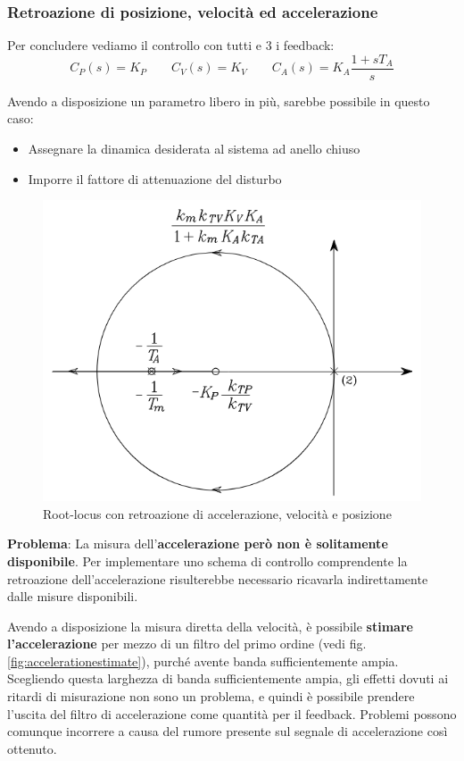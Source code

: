 \vspace{35pt}
\subsubsection{Retroazione di posizione, velocità ed accelerazione}

Per concludere vediamo il controllo con tutti e 3 i feedback:
$$
C_P(s) = K_P \qquad C_V(s)=K_V \qquad C_A(s)=K_A\frac{1+sT_A}{s}
$$

Avendo a disposizione un parametro libero in più, sarebbe
possibile in questo caso:
\begin{itemize}
	\item Assegnare la dinamica desiderata al sistema ad anello chiuso
	\item Imporre il fattore di attenuazione del disturbo
\end{itemize}


\begin{figure}[ht!]
	\centering
	\includegraphics[width=0.5\linewidth]{images/root_locus_3}
	\caption{Root-locus con retroazione di accelerazione, velocità e posizione}
	\label{fig:rootlocus3}
\end{figure}

\textbf{Problema}:
La misura dell’\textbf{accelerazione però non è solitamente disponibile}. Per implementare uno schema di controllo comprendente la retroazione dell’accelerazione risulterebbe necessario ricavarla indirettamente dalle misure disponibili.

Avendo a disposizione la misura diretta della velocità, è possibile \textbf{stimare l’accelerazione} per mezzo di un filtro del primo ordine (vedi fig. \ref{fig:accelerationestimate}), purché avente banda sufficientemente ampia. Scegliendo questa larghezza di banda sufficientemente ampia, gli effetti dovuti ai ritardi di misurazione non sono un problema, e quindi è possibile prendere l'uscita del filtro di accelerazione come quantità per il feedback. Problemi possono comunque incorrere a causa del rumore presente sul segnale di accelerazione così ottenuto.

